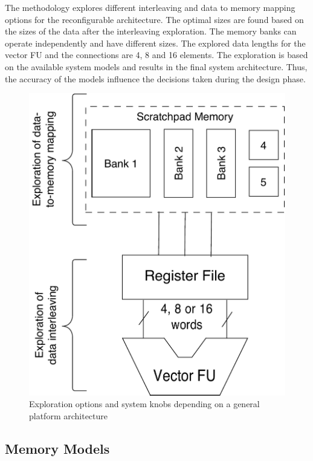 The methodology explores different interleaving and data to memory mapping options for the reconfigurable architecture.
The optimal sizes are found based on the sizes of the data after the interleaving exploration.
The memory banks can operate independently and have different sizes.
The explored data lengths for the vector FU and the connections are 4, 8 and 16 elements.
The exploration is based on the available system models and results in the final system architecture.
Thus, the accuracy of the models influence the decisions taken during the design phase.

\begin{figure}
\centering
	\includegraphics[scale = 0.5]{D/Images/Architecture.pdf} 
	\caption{Exploration options and system knobs depending on a general platform architecture}
	\label{fig:arch}
\end{figure}

\subsection{Memory Models}


